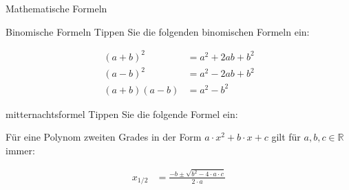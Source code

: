 \documentclass[
    inlineshortcut=java, %
    corporatedesign, %
    boxarc, %
]{algoexercise}
\begin{document}
    \clearpage{}
    \begin{task}[points=auto]{Mathematische Formeln}
        \begin{subtask*}[points=3]{Binomische Formeln}
            Tippen Sie die folgenden binomischen Formeln ein:
            \begin{grayInfoBox}
                \begin{align}
                    (a+b)^2    & = a^2 + 2ab + b^2 \\
                    (a-b)^2    & = a^2 - 2ab + b^2 \\
                    (a+b)(a-b) & = a^2 - b^2
                \end{align}
            \end{grayInfoBox}
        \end{subtask*}
        \begin{subtask*}[points=1]{mitternachtsformel}
            Tippen Sie die folgende Formel ein:
            \begin{grayInfoBox}
                Für eine Polynom zweiten Grades in der Form $a\cdot x^2+b\cdot x + c$ gilt für $a,b,c \in \mathbb{R}$ immer:%

                \begin{align}
                    x_{1/2} & =\frac{-b\pm\sqrt{b^{2}-4\cdot a \cdot c}}{2\cdot a}
                \end{align}

            \end{grayInfoBox}
        \end{subtask*}
    \end{task}
\end{document}
